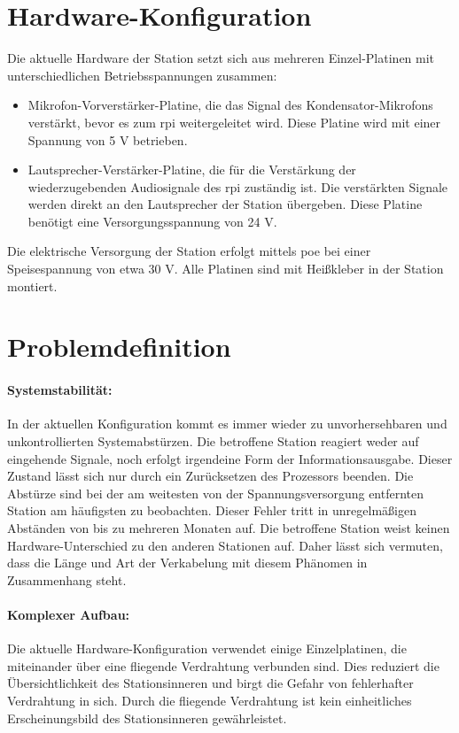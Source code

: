 \section{Hardware-Konfiguration}
Die aktuelle Hardware der Station setzt sich aus mehreren Einzel-Platinen mit unterschiedlichen Betriebsspannungen zusammen:
\begin{itemize}
    \item Mikrofon-Vorverstärker-Platine, die das Signal des Kondensator-Mikrofons verstärkt, bevor es zum \ac{rpi} weitergeleitet wird. Diese Platine wird mit einer Spannung von 5 V betrieben.
    \item Lautsprecher-Verstärker-Platine, die für die Verstärkung der wiederzugebenden Audiosignale des \ac{rpi} zuständig ist. Die verstärkten Signale werden direkt an den Lautsprecher der Station übergeben. Diese Platine benötigt eine Versorgungsspannung von 24 V.
\end{itemize}
Die elektrische Versorgung der Station erfolgt mittels \ac{poe} bei einer Speisespannung von etwa 30 V.
Alle Platinen sind mit Heißkleber in der Station montiert.

\section{Problemdefinition}
\paragraph{Systemstabilität:} %
In der aktuellen Konfiguration kommt es immer wieder zu unvorhersehbaren und unkontrollierten Systemabstürzen.
Die betroffene Station reagiert weder auf eingehende Signale, noch erfolgt irgendeine Form der Informationsausgabe.
Dieser Zustand lässt sich nur durch ein Zurücksetzen des Prozessors beenden.
Die Abstürze sind bei der am weitesten von der Spannungsversorgung entfernten Station am häufigsten zu beobachten.
Dieser Fehler tritt in unregelmäßigen Abständen von bis zu mehreren Monaten auf.
Die betroffene Station weist keinen Hardware-Unterschied zu den anderen Stationen auf.
Daher lässt sich vermuten, dass die Länge und Art der Verkabelung mit diesem Phänomen in Zusammenhang steht.

\paragraph{Komplexer Aufbau:} %
Die aktuelle Hardware-Konfiguration verwendet einige Einzelplatinen, die miteinander über eine fliegende Verdrahtung verbunden sind.
Dies reduziert die Übersichtlichkeit des Stationsinneren und birgt die Gefahr von fehlerhafter Verdrahtung in sich.
Durch die fliegende Verdrahtung ist kein einheitliches Erscheinungsbild des Stationsinneren gewährleistet.


